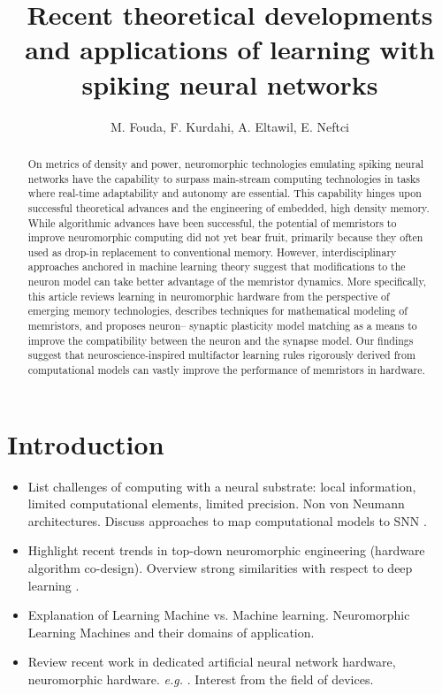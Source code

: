\documentclass[english]{article}
\renewcommand{\cite}{\citep}
\begin{document}


\title{Recent theoretical developments and applications of learning with spiking neural networks}
\author{M. Fouda, F. Kurdahi, A. Eltawil, E. Neftci}
\maketitle

\begin{abstract}
On metrics of density and power, neuromorphic technologies emulating spiking neural networks have the capability to surpass main-stream computing technologies in tasks where real-time adaptability and autonomy are essential.
This capability hinges upon successful theoretical advances and the engineering of embedded, high density memory.
While algorithmic advances have been successful, the potential of memristors to improve neuromorphic computing did not yet bear fruit, primarily because they often used as drop-in replacement to conventional memory.
However, interdisciplinary approaches anchored in machine learning theory suggest that modifications to the neuron model can take better advantage of the memristor dynamics.
More specifically, this article reviews learning in neuromorphic hardware from the perspective of emerging memory technologies, describes techniques for mathematical modeling of memristors, and proposes neuron-- synaptic plasticity model matching as a means to improve the compatibility between the neuron and the synapse model.
Our findings suggest that neuroscience-inspired multifactor learning rules rigorously derived from computational models can vastly improve the performance of memristors in hardware.
\end{abstract}

\section{Introduction}
\begin{itemize}
  \item List challenges of computing with a neural substrate: local information, limited computational elements, limited precision. Non von Neumann architectures. Discuss approaches to map computational models to SNN \cite{Neftci18_datapowe}.  
  \item Highlight recent trends in top-down neuromorphic engineering (hardware algorithm co-design). Overview strong similarities with respect to deep learning \cite{Neftci18_datapowe}. 
  \item Explanation of Learning Machine vs. Machine learning. Neuromorphic Learning Machines and their domains of application. 
  \item Review recent work in dedicated artificial neural network hardware, neuromorphic hardware. \emph{e.g.} \cite{Jouppi_etal17_in-dperf}. Interest from the field of devices.
\end{itemize}
\end{document}
